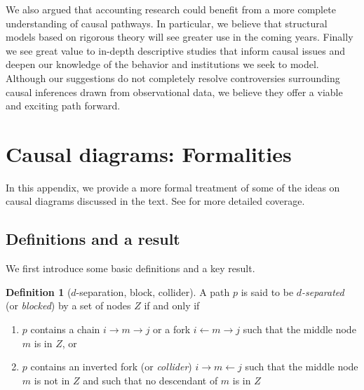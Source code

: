 \documentclass[12pt,reqno,titlepage]{amsart}
\theoremstyle{definition}
\newtheorem{definition}{Definition}
\begin{document}
\begin{doublespace}
We also argued that  accounting research could benefit from a more complete understanding of causal pathways. 
In particular, we believe that structural models based on rigorous theory will see greater use in the coming years.
Finally we see great value to in-depth descriptive studies that inform causal issues and deepen our knowledge of the behavior and institutions we seek to model.
Although our suggestions do not completely resolve controversies surrounding causal inferences drawn from observational data, we believe they offer a viable and exciting path forward.

\end{doublespace}

\clearpage


\clearpage



\clearpage


\appendix
\section{Causal diagrams: Formalities} \label{append}
In this appendix, we provide a more formal treatment of some of the ideas on causal diagrams discussed in the text.
See \citet{Pearl:2009vo} for more detailed coverage.
 
 \subsection{Definitions and a result}
 We first introduce some basic definitions and a key result.
 
\begin{definition}[$d$-separation, block, collider]
A path $p$ is said to be \emph{$d$-separated} (or \emph{blocked}) by a set of nodes $Z$ if and only if
\begin{enumerate}
	\item $p$ contains a chain $i \rightarrow m \rightarrow j$ or a fork $i \leftarrow m \rightarrow j$ such that the middle node $m$ is in $Z$, or
	\item $p$ contains an inverted fork (or \emph{collider}) $i \rightarrow m \leftarrow j$ such that the middle node $m$ is not in $Z$ and such that no descendant of $m$ is in $Z$
\end{enumerate}
\end{definition}
\end{document}
